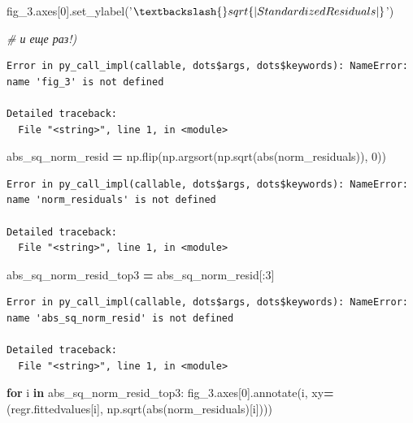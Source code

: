 \documentclass[]{book}
\newenvironment{Shaded}{\begin{snugshade}}{\end{snugshade}}
\newcommand{\BuiltInTok}[1]{#1}
\newcommand{\CommentTok}[1]{\textcolor[rgb]{0.56,0.35,0.01}{\textit{#1}}}
\newcommand{\ControlFlowTok}[1]{\textcolor[rgb]{0.13,0.29,0.53}{\textbf{#1}}}
\newcommand{\DecValTok}[1]{\textcolor[rgb]{0.00,0.00,0.81}{#1}}
\newcommand{\KeywordTok}[1]{\textcolor[rgb]{0.13,0.29,0.53}{\textbf{#1}}}
\newcommand{\NormalTok}[1]{#1}
\newcommand{\OperatorTok}[1]{\textcolor[rgb]{0.81,0.36,0.00}{\textbf{#1}}}
\newcommand{\StringTok}[1]{\textcolor[rgb]{0.31,0.60,0.02}{#1}}
\begin{document}
\begin{Shaded}
\begin{Highlighting}[]
\NormalTok{fig_3.axes[}\DecValTok{0}\NormalTok{].set_ylabel(}\StringTok{'$\textbackslash{}sqrt\{|Standardized Residuals|\}$'}\NormalTok{)}

\CommentTok{# и еще раз!)}
\end{Highlighting}
\end{Shaded}

\begin{verbatim}
Error in py_call_impl(callable, dots$args, dots$keywords): NameError: name 'fig_3' is not defined

Detailed traceback: 
  File "<string>", line 1, in <module>
\end{verbatim}

\begin{Shaded}
\begin{Highlighting}[]
\NormalTok{abs_sq_norm_resid }\OperatorTok{=}\NormalTok{ np.flip(np.argsort(np.sqrt(}\BuiltInTok{abs}\NormalTok{(norm_residuals)), }\DecValTok{0}\NormalTok{))}
\end{Highlighting}
\end{Shaded}

\begin{verbatim}
Error in py_call_impl(callable, dots$args, dots$keywords): NameError: name 'norm_residuals' is not defined

Detailed traceback: 
  File "<string>", line 1, in <module>
\end{verbatim}

\begin{Shaded}
\begin{Highlighting}[]
\NormalTok{abs_sq_norm_resid_top3 }\OperatorTok{=}\NormalTok{ abs_sq_norm_resid[:}\DecValTok{3}\NormalTok{]}
\end{Highlighting}
\end{Shaded}

\begin{verbatim}
Error in py_call_impl(callable, dots$args, dots$keywords): NameError: name 'abs_sq_norm_resid' is not defined

Detailed traceback: 
  File "<string>", line 1, in <module>
\end{verbatim}

\begin{Shaded}
\begin{Highlighting}[]
\ControlFlowTok{for}\NormalTok{ i }\KeywordTok{in}\NormalTok{ abs_sq_norm_resid_top3:}
\NormalTok{    fig_3.axes[}\DecValTok{0}\NormalTok{].annotate(i, xy}\OperatorTok{=}\NormalTok{(regr.fittedvalues[i], }
\NormalTok{                                   np.sqrt(}\BuiltInTok{abs}\NormalTok{(norm_residuals)[i])))}
\end{Highlighting}
\end{Shaded}
\end{document}
